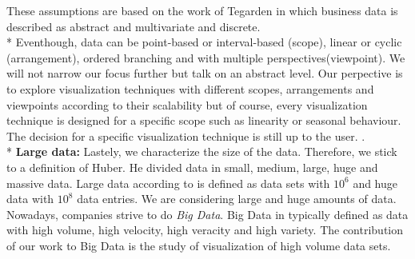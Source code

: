 These assumptions are based on the work of Tegarden in which business data is described as abstract and multivariate and discrete\cite{Tegarden1999}.
\\*
Eventhough, data can be point-based or interval-based (scope), linear or cyclic (arrangement), ordered branching and with multiple perspectives(viewpoint)\cite{Aigner2011}. We will not narrow our focus further but talk on an abstract level. Our perpective is to explore visualization techniques with different scopes, arrangements and viewpoints according to their scalability but of course, every visualization technique is designed for a specific scope such as linearity or seasonal behaviour. The decision for a specific visualization technique is still up to the user. .\\*
\textbf{Large data:} Lastely, we characterize the size of the data. Therefore, we stick to a definition of Huber. He divided data in small, medium, large, huge and massive data. Large data according to\cite{Huber1994} is defined as data sets with $10^6$ and huge data with $10^8$ data entries. We are considering large and huge amounts of data. Nowadays, companies strive to do \textit{Big Data}. Big Data in typically defined as data with  high volume, high velocity, high veracity and high variety\cite{Wang2015}. The contribution of our work to Big Data is the study of visualization of high volume data sets.



